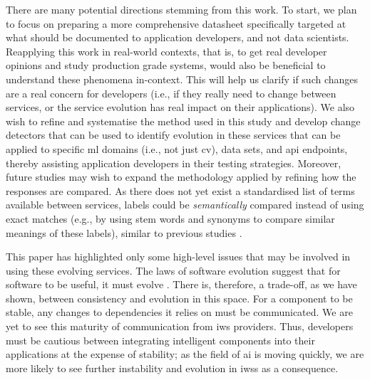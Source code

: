 There are many potential directions stemming from this work. 
To start, we plan to focus on preparing a more comprehensive datasheet specifically targeted at what should be documented to application developers, and not data scientists. 
Reapplying this work in real-world contexts, that is, to get real developer opinions and study production grade systems, would also be beneficial to understand these  phenomena in-context. This will help us clarify if such changes are a real concern for developers (i.e., if they really need to change between services, or the service evolution has real impact on their applications).
We also wish to refine and systematise the method used in this study and develop change detectors that can be used to identify evolution in these services that can be applied to specific \gls{ml} domains (i.e., not just \gls{cv}), data sets, and \gls{api} endpoints, thereby assisting application developers in their testing strategies.
Moreover, future studies may wish to expand the methodology applied by refining how the responses are compared. As there does not yet exist a standardised list of terms available between services, labels could be \textit{semantically} compared instead of using exact matches (e.g., by using stem words and synonyms to compare similar meanings of these labels), similar to previous studies \citep{Ohtake:2019vi}.

This paper has highlighted only some high-level issues that may be involved in using these evolving services. The laws of software evolution suggest that for software to be useful, it must evolve \citep{THOMAS2014457,1572302}. There is, therefore, a trade-off, as we have shown, between consistency and evolution in this space. For a component to be stable, any changes to dependencies it relies on must be communicated. We are yet to see this maturity of communication from \gls{iws} providers. Thus, developers must be cautious between integrating intelligent components into their applications at the expense of stability; as the field of \gls{ai} is moving quickly, we are more likely to see further instability and evolution in \glspl{iws} as a consequence.